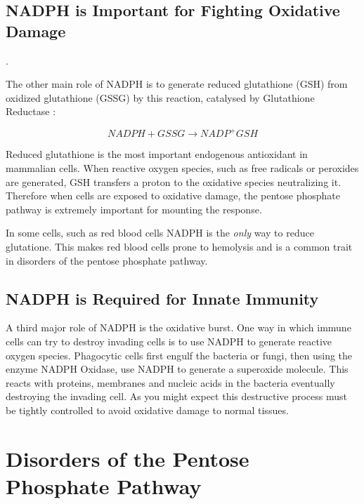 \documentclass{tufte-handout}
\begin{document}
\subsection{NADPH is Important for Fighting Oxidative Damage}.

The other main role of NADPH is to generate reduced glutathione (GSH) from oxidized glutathione (GSSG) by this reaction, catalysed by Glutathione Reductase :

\begin{equation}
NADPH + GSSG \rightarrow NADP^+  GSH
\end{equation}

Reduced glutathione is the most important endogenous antioxidant in mammalian cells.  When reactive oxygen species, such as free radicals or peroxides are generated, GSH transfers a proton to the oxidative species neutralizing it.  Therefore when cells are exposed to oxidative damage, the pentose phosphate pathway is extremely important for mounting the response.

In some cells, such as red blood cells NADPH is the \textit{only} way to reduce glutatione.  This makes red blood cells prone to hemolysis and is a common trait in disorders of the pentose phosphate pathway.

\subsection{NADPH is Required for Innate Immunity}

A third major role of NADPH is the oxidative burst.  One way in which immune cells can try to destroy invading cells is to use NADPH  to generate reactive oxygen species.  Phagocytic cells first engulf the bacteria or fungi, then using the enzyme NADPH Oxidase, use NADPH to generate a superoxide molecule.  This reacts with proteins, membranes and nucleic acids in the bacteria eventually destroying the invading cell.  As you might expect this destructive process must be tightly controlled to avoid oxidative damage to normal tissues.

\section{Disorders of the Pentose Phosphate Pathway}
\end{document}
